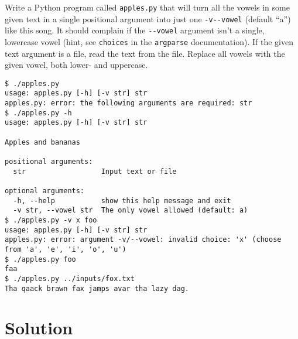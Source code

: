 \documentclass[]{article}
\begin{document}
Write a Python program called \texttt{apples.py} that will turn all the
vowels in some given text in a single positional argument into just one
\texttt{-v\textbar{}-\/-vowel} (default ``a'') like this song. It should
complain if the \texttt{-\/-vowel} argument isn't a single, lowercase
vowel (hint, see \texttt{choices} in the \texttt{argparse}
documentation). If the given text argument is a file, read the text from
the file. Replace all vowels with the given vowel, both lower- and
uppercase.

\begin{verbatim}
$ ./apples.py
usage: apples.py [-h] [-v str] str
apples.py: error: the following arguments are required: str
$ ./apples.py -h
usage: apples.py [-h] [-v str] str

Apples and bananas

positional arguments:
  str                  Input text or file

optional arguments:
  -h, --help           show this help message and exit
  -v str, --vowel str  The only vowel allowed (default: a)
$ ./apples.py -v x foo
usage: apples.py [-h] [-v str] str
apples.py: error: argument -v/--vowel: invalid choice: 'x' (choose from 'a', 'e', 'i', 'o', 'u')
$ ./apples.py foo
faa
$ ./apples.py ../inputs/fox.txt
Tha qaack brawn fax jamps avar tha lazy dag.
\end{verbatim}

\pagebreak

\hypertarget{solution-4}{%
\section{Solution}\label{solution-4}}
\end{document}
